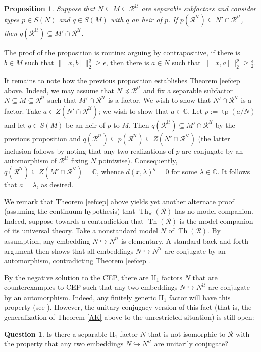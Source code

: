 \documentclass[12pt]{amsart}
\newtheorem{prop}[thm]{Proposition}
\theoremstyle{definition}
\newtheorem{question}[thm]{Question}
\def\bb{\mathbb}
\def\bb{\mathbb}
\def\u{\mathsf 1}
\def \tp{\operatorname{tp}}
\def \Th{\operatorname{Th}}
\def \R{\mathcal R}
\def \u{\mathcal U}
\begin{document}
\begin{prop}
Suppose that $N\subseteq M\subseteq \R^\u$ are separable subfactors and consider types $p\in S(N)$ and $q\in S(M)$ with $q$ an heir of $p$.  If $p(\R^\u)\subseteq N'\cap \R^\u$, then $q(\R^\u)\subseteq M'\cap \R^\u$. 
\end{prop}

The proof of the proposition is routine:  arguing by contrapositive, if there is $b\in M$ such that $\|[x,b]\|_2^q\geq \epsilon$, then there is $a\in N$ such that $\|[x,a]\|_2^p\geq \frac{\epsilon}{2}$.  

It remains to note how the previous proposition establishes Theorem \ref{eefcep} above.  Indeed, we may assume that $N\preceq \R^\u$ and fix a separable subfactor $N\subseteq M\subseteq \R^\u$ such that $M'\cap \R^\u$ is a factor.  We wish to show that $N'\cap \R^\u$ is a factor.  Take $a\in Z(N'\cap \R^\u)$; we  wish to show that $a\in \bb C$.  Let $p:=\tp(a/N)$ and let $q\in S(M)$ be an heir of $p$ to $M$.  Then $q(\R^\u)\subseteq M'\cap \R^\u$ by the previous proposition and $q(\R^\u)\subseteq p(\R^\u)\subseteq Z(N'\cap \R^\u)$ (the latter inclusion follows by noting that any two realizations of $p$ are conjugate by an automorphism of $\R^\u$ fixing $N$ pointwise).  Consequently, $q(\R^\u)\subseteq Z(M'\cap \R^\u)=\bb C$, whence $d(x,\lambda)^q=0$ for some $\lambda\in \bb C$.  It follows that $a=\lambda$, as desired.

We remark that Theorem \ref{eefcep} above yields yet another alternate proof (assuming the continuum hypothesis) that $\Th_\forall(\R)$ has no model companion.  Indeed, suppose towards a contradiction that $\Th(\R)$ is the model companion of its universal theory.  Take a nonstandard model $N$ of $\Th(\R)$.  By assumption, any embedding $N\hookrightarrow N^\u$ is elementary. A standard back-and-forth argument then shows that all embeddings $N\hookrightarrow N^\u$ are conjugate by an automorphism, contradicting Theorem \ref{eefcep}.

By the negative solution to the CEP, there are II$_1$ factors $N$ that are counterexamples to CEP such that any two embeddings $N\hookrightarrow N^\u$ are conjugate by an automorphism.  Indeed, any finitely generic II$_1$ factor will have this property (see \cite{enforceable}).  However, the unitary conjugacy version of this fact (that is, the generalization of Theorem \ref{AK} above to the unrestricted situation) is still open:

\begin{question}\label{Runique?}
Is there a separable II$_1$ factor $N$ that is not isomorphic to $\R$ with the property that any two embeddings $N\hookrightarrow N^\u$ are unitarily conjugate?
\end{question}
\end{document}
